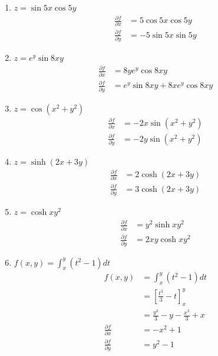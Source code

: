 \begin{enumerate}
    \item $z=\sin 5 x \cos 5 y$
          \sol{}
          \begin{align*}
              \frac{\partial f}{\partial x} & = 5\cos 5x \cos 5y \\ \frac{\partial f}{\partial y} &= -5\sin 5x \sin 5y
          \end{align*}

    \item $z=e^y \sin 8 x y$
          \sol{}
          \begin{align*}
              \frac{\partial f}{\partial x} & = 8ye^y \cos 8xy \\ \frac{\partial f}{\partial y} &= e^y \sin 8xy + 8xe^y \cos 8xy
          \end{align*}

    \item $z=\cos \left(x^2+y^2\right)$
          \sol{}
          \begin{align*}
              \frac{\partial f}{\partial x} & = -2x\sin (x^2+y^2) \\ \frac{\partial f}{\partial y} &= -2y\sin (x^2+y^2)
          \end{align*}

    \item $z=\sinh (2 x+3 y)$
          \sol{}
          \begin{align*}
              \frac{\partial f}{\partial x} & = 2\cosh (2x+3y) \\ \frac{\partial f}{\partial y} &= 3\cosh (2x+3y)
          \end{align*}

    \item $z=\cosh x y^2$
          \sol{}
          \begin{align*}
              \frac{\partial f}{\partial x} & = y^2\sinh xy^2 \\ \frac{\partial f}{\partial y} &= 2xy\cosh xy^2
          \end{align*}

          \newpage
    \item $f(x, y)=\displaystyle\int_x^y\left(t^2-1\right) d t$
          \sol{}
          \begin{align*}
              f(x, y)                       & =\int_x^y\left(t^2-1\right) d t         \\
                                            & = \left[\frac{t^3}{3} - t\right]_x^y    \\
                                            & = \frac{y^3}{3} - y - \frac{x^3}{3} + x \\
              \frac{\partial f}{\partial x} & = -x^2 + 1                              \\ \frac{\partial f}{\partial y} &= y^2 - 1
          \end{align*}


\end{enumerate}
